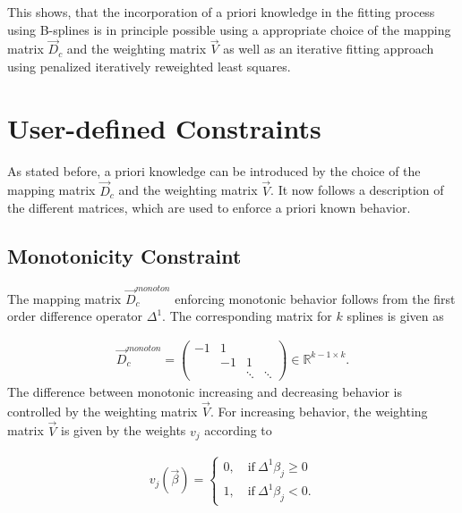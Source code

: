 \documentclass[10pt,a4paper]{article}
\begin{document}
	This shows, that the incorporation of a priori knowledge in the fitting process using B-splines is in principle possible using a appropriate choice of the mapping matrix $\vec{D}_c$ and the weighting matrix $\vec{V}$ as well as an iterative fitting approach using penalized iteratively reweighted least squares. 
		
	\section{User-defined Constraints} \label{sec:user-defined-constraints}
	
	As stated before, a priori knowledge can be introduced by the choice of the mapping matrix $\vec{D}_c$ and the weighting matrix $\vec{V}$. It now follows a description of the different matrices, which are used to enforce a priori known behavior. 
	
	\subsection{Monotonicity Constraint}
	
	The mapping matrix $\vec{D}_c^{monoton}$ enforcing monotonic behavior follows from the first order difference operator $\Delta^1$. The corresponding matrix for $k$ splines is given as
	
	\begin{align} \label{eq:D_c_monoton}
		\vec{D}_c^{monoton} = \begin{pmatrix}  -1 & 1  &  		& \\ 
		  												 & -1 & 1 		& \\ 
														 &    & \ddots  & \ddots  
		\end{pmatrix} \in \mathbb{R}^{k-1 \times k}.
	\end{align}
	The difference between monotonic increasing and decreasing behavior is controlled by the weighting matrix $\vec{V}$. For increasing behavior, the weighting matrix $\vec{V}$ is given by the weights $v_j$ according to
	
	\begin{align} \label{eq:v_monoton_inc}
		v_j(\vec{\beta}) = \begin{cases} 0, \quad \text{if} \ \Delta^1\beta_j \ge 0 \\ 
					        					1, \quad \text{if} \ \Delta^1\beta_j < 0.
			\end{cases}	
	\end{align}
	
\end{document}

